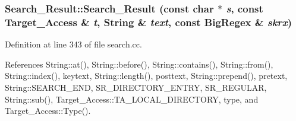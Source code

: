 \subsubsection{\setlength{\rightskip}{0pt plus 5cm}Search\_\-Result::Search\_\-Result (const char $\ast$ {\em s}, const {\bf Target\_\-Access} \& {\em t}, {\bf String} \& {\em text}, const {\bf Big\-Regex} \& {\em skrx})}\label{classSearch__Result_a0}




Definition at line 343 of file search.cc.

References String::at(), String::before(), String::contains(), String::from(), String::index(), keytext, String::length(), posttext, String::prepend(), pretext, String::SEARCH\_\-END, SR\_\-DIRECTORY\_\-ENTRY, SR\_\-REGULAR, String::sub(), Target\_\-Access::TA\_\-LOCAL\_\-DIRECTORY, type, and Target\_\-Access::Type().



